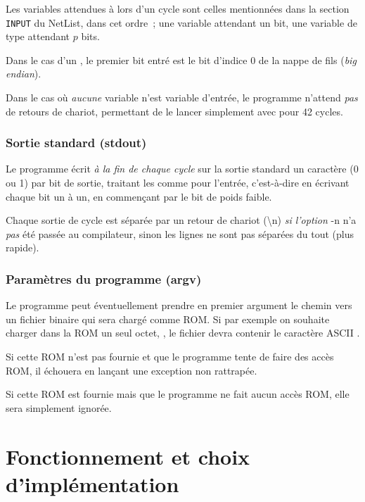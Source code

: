 \documentclass[11pt,a4paper]{article}
\begin{document}
Les variables attendues à lors d'un cycle sont celles mentionnées dans la section \lstinline`INPUT` du NetList, dans cet ordre~; une variable  attendant un bit, une variable de type  attendant $p$ bits.

Dans le cas d'un , le premier bit entré est le bit d'indice 0 de la nappe de fils (\emph{big endian}).

Dans le cas où \emph{aucune} variable n'est variable d'entrée, le programme n'attend \emph{pas} de retours de chariot, permettant de le lancer simplement avec  pour 42 cycles.

\subsubsection*{Sortie standard (stdout)}

Le programme écrit \emph{à la fin de chaque cycle} sur la sortie standard un caractère (0 ou 1) par bit de sortie, traitant les  comme pour l'entrée, c'est-à-dire en écrivant chaque bit un à un, en commençant par le bit de poids faible.

Chaque sortie de cycle est séparée par un retour de chariot (\textbackslash n) \emph{si l'option} -n n'a \emph{pas} été passée au compilateur, sinon les lignes ne sont pas séparées du tout (plus rapide).

\subsubsection*{Paramètres du programme (argv)}

Le programme peut éventuellement prendre en premier argument le chemin vers un fichier binaire qui sera chargé comme ROM. Si par exemple on souhaite charger dans la ROM un seul octet, , le fichier devra contenir le caractère ASCII \og * \fg{}.

Si cette ROM n'est pas fournie et que le programme tente de faire des accès ROM, il échouera en lançant une exception non rattrapée.

Si cette ROM est fournie mais que le programme ne fait aucun accès ROM, elle sera simplement ignorée.

\section{Fonctionnement et choix d'implémentation}
\end{document}
